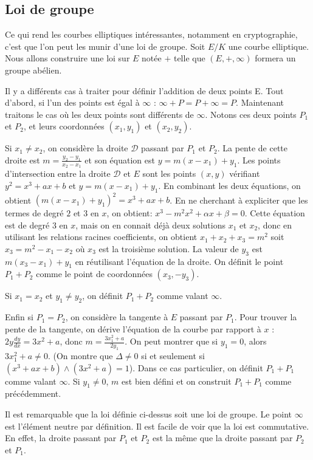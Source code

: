\documentclass{article}
\theoremstyle{plain}%
\theoremstyle{definition}%
\begin{document}
\subsection{Loi de groupe}

Ce qui rend les courbes elliptiques intéressantes, notamment en cryptographie, c'est que l'on peut les munir d'une loi de groupe. Soit $E/K$ une courbe elliptique. Nous allons construire une loi sur $E$ notée $+$ telle que $(E, +, \infty)$ formera un groupe abélien.

Il y a différents cas à traiter pour définir l'addition de deux points E.
Tout d'abord, si l'un des points est égal à $\infty$ : $\infty+P = P+\infty = P$.
Maintenant traitons le cas où les deux points sont différents de $\infty$. Notons ces deux points $P_1$ et $P_2$, et leurs coordonnées $(x_1, y_1)$ et $(x_2, y_2)$.

Si $x_1\neq x_2$, on considère la droite $\mathcal D$ passant par $P_1$ et $P_2$. La pente de cette droite est $m = \frac{y_2-y_1}{x_2-x_1}$ et son équation est $y = m(x-x_1) + y_1$. Les points d'intersection entre la droite $\mathcal D$ et $E$ sont les points $(x, y)$ vérifiant $y^2 = x^3 + ax + b$ et $y = m(x-x_1) + y_1$. En combinant les deux équations, on obtient $(m(x-x_1) + y_1)^2 =  x^3 + ax + b$. 
En ne cherchant à expliciter que les termes de degré $2$ et $3$ en $x$, on obtient: $ x^3 -m^2x^2 + \alpha x + \beta = 0$. 
Cette équation est de degré $3$ en $x$, mais on en connait déjà  deux solutions $x_1$ et $x_2$, donc en utilisant les relations racines coefficients, on obtient $x_1+x_2+x_3 = m^2$ soit $x_3 = m^2 - x_1 - x_2$ où $x_3$ est la troisième solution. La valeur de $y_3$ est $m(x_3-x_1)+y_1$ en réutilisant l'équation de la droite. On définit le point $P_1 + P_2$ comme le point de coordonnées $(x_3, -y_3)$.

Si $x_1=x_2$ et $y_1\neq y_2$, on définit $P_1+P_2$ comme valant $\infty$.

Enfin si $P_1 = P_2$, on considère la tangente à $E$ passant par $P_1$. Pour trouver la pente de la tangente, on dérive l'équation de la courbe par rapport à $x$ : $2y\frac{dy}{dx} = 3x^2 + a$, donc $m = \frac{3x_1^2 + a}{2y_1}$. On peut montrer que si $y_1 = 0$, alors $3x_1^2 + a \neq 0$. 
(On montre que $\Delta \neq 0$ si et seulement si $(x^3 + ax + b)\wedge(3x^2 + a) = 1$). 
Dans ce cas particulier, on définit $P_1+P_1$ comme valant $\infty$.
Si  $y_1 \neq  0$, $m$ est bien défini et on construit $P_1+P_1$ comme précédemment.

Il est remarquable que la loi définie ci-dessus soit une loi de groupe. Le point $\infty$ est l'élément neutre par définition. Il est facile de voir que la loi est commutative. En effet, la droite passant par $P_1$ et $P_2$ est la même que la droite passant par $P_2$ et $P_1$.
\end{document}
